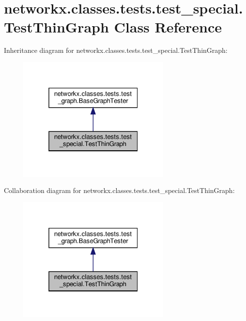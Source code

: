 \hypertarget{classnetworkx_1_1classes_1_1tests_1_1test__special_1_1TestThinGraph}{}\section{networkx.\+classes.\+tests.\+test\+\_\+special.\+Test\+Thin\+Graph Class Reference}
\label{classnetworkx_1_1classes_1_1tests_1_1test__special_1_1TestThinGraph}


Inheritance diagram for networkx.\+classes.\+tests.\+test\+\_\+special.\+Test\+Thin\+Graph\+:
\nopagebreak
\begin{figure}[H]
\begin{center}
\leavevmode
\includegraphics[width=217pt]{classnetworkx_1_1classes_1_1tests_1_1test__special_1_1TestThinGraph__inherit__graph}
\end{center}
\end{figure}


Collaboration diagram for networkx.\+classes.\+tests.\+test\+\_\+special.\+Test\+Thin\+Graph\+:
\nopagebreak
\begin{figure}[H]
\begin{center}
\leavevmode
\includegraphics[width=217pt]{classnetworkx_1_1classes_1_1tests_1_1test__special_1_1TestThinGraph__coll__graph}
\end{center}
\end{figure}
